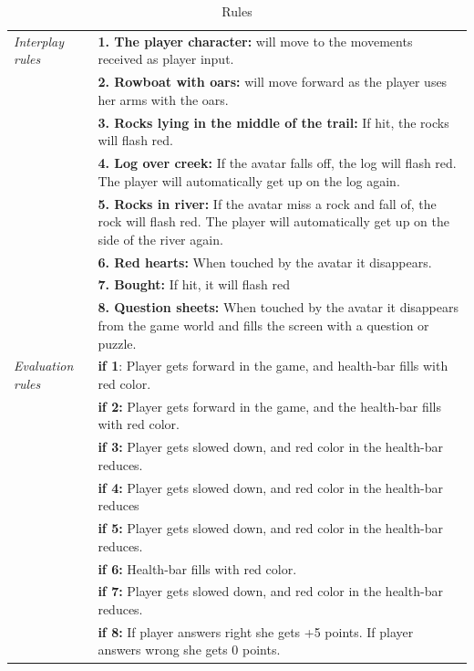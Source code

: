 \begin{table} [H]
\centering
    \begin{tabular}{|p{}|p{}|}
       \hline
	   \emph{Interplay rules} & \textbf{1. The player character:} will move to the movements received as player input. \\ \cline{2-2}
	     & \textbf{2. Rowboat with oars:} will move forward as the player  uses her arms with the oars. \\ \cline{2-2}
	       & \textbf{3. Rocks lying in the middle of the trail:} If hit, the  rocks will flash red.  \\ \cline{2-2}
	        & \textbf{4. Log over creek:} If the avatar falls off, the log will flash red. The player will automatically get up on the log again. \\ \cline{2-2}
	        & \textbf{5. Rocks in river:} If the avatar miss a rock and fall of, the rock will flash red. The player will automatically get up on the side of the river again. \\ \cline{2-2}
	         &  \textbf{6. Red hearts:} When touched by the avatar it disappears. \\ \cline{2-2}
	          &  \textbf{7. Bought:} If hit, it will flash red \\ \cline{2-2}
	           &  \textbf{8. Question sheets:} When touched by the avatar  it  disappears from the game world and fills the screen with  a  question or puzzle. \\ \hline
	            \emph{Evaluation rules} & \textbf{if 1}: Player gets forward in the game, and health-bar fills with red color. \\ \cline{2-2}
	               & \textbf{if 2:} Player gets forward in the game, and the health-bar fills with red color.   \\ \cline{2-2}
	               & \textbf{if 3:} Player gets slowed down, and red color in the health-bar reduces.   \\ \cline{2-2}
	               & \textbf{if 4:} Player gets slowed down, and red color in the health-bar reduces   \\ \cline{2-2}
             	   & \textbf{if 5:} Player gets slowed down, and red color in the health-bar reduces.   \\ \cline{2-2}
	               & \textbf{if 6:} Health-bar fills with red color.  \\ \cline{2-2}
	               & \textbf{if 7:} Player gets slowed down, and red color in the health-bar reduces.  \\ \cline{2-2}
	               & \textbf{if 8:} If player answers right she gets +5 points. If player answers wrong she gets 0 points.  \\ \hline
    \end{tabular}
    \caption[Rules in the "Nature Trail" game]{Rules}
    \label{tab:rules1}
\end{table}  

